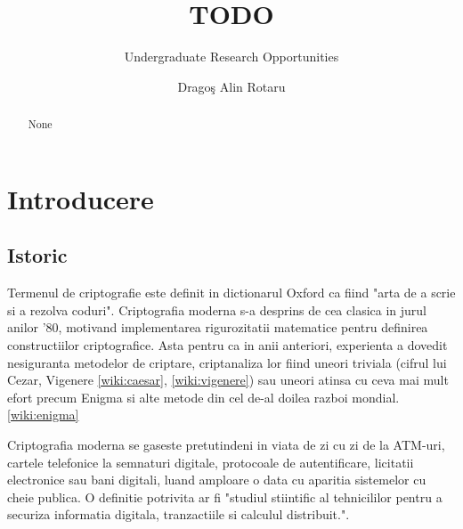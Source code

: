 \documentclass{llncs}
\begin{document}
\pagestyle{empty}
%
%
\title{TODO}
%
%
\subtitle{Undergraduate Research Opportunities}
\author{Drago\c{s} Alin Rotaru}
%



\maketitle              %

\begin{abstract}
  None
\end{abstract}


\section{Introducere}
\label{sec:intro}

\subsection{Istoric}
Termenul de criptografie este definit in dictionarul Oxford ca fiind "arta de a scrie si a rezolva coduri".
Criptografia moderna s-a desprins de cea clasica in jurul anilor '80, motivand implementarea rigurozitatii matematice pentru definirea constructiilor criptografice. Asta pentru ca in anii anteriori, experienta a dovedit nesiguranta metodelor de criptare, criptanaliza lor fiind uneori triviala (cifrul lui Cezar, Vigenere \ref{wiki:caesar}, \ref{wiki:vigenere}) sau uneori atinsa cu ceva mai mult efort precum Enigma si alte metode din cel de-al doilea razboi mondial. \ref{wiki:enigma}

Criptografia moderna se gaseste pretutindeni in viata de zi cu zi de la ATM-uri, cartele telefonice la semnaturi digitale, protocoale de autentificare, licitatii electronice sau bani digitali, luand amploare o data cu aparitia sistemelor cu cheie publica. O definitie potrivita ar fi "studiul stiintific al tehnicililor pentru a securiza informatia digitala, tranzactiile si calculul distribuit.". \cite{Katz:2007}
\end{document}
